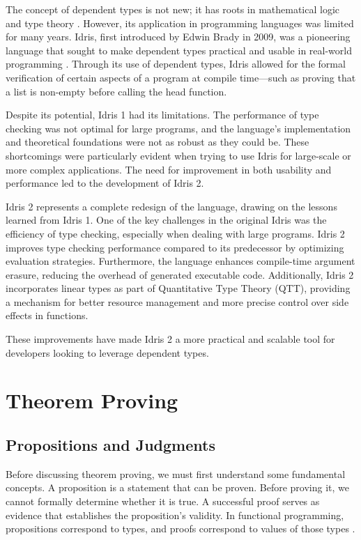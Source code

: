 \documentclass[]{rptuseminar}
\begin{document}
The concept of dependent types is not new; it has roots in mathematical logic and type theory \cite{martin-lof1984}. However, its application in programming languages was limited for many years. Idris, first introduced by Edwin Brady in 2009, was a pioneering language that sought to make dependent types practical and usable in real-world programming \cite{brady2013idris}. Through its use of dependent types, Idris allowed for the formal verification of certain aspects of a program at compile time—such as proving that a list is non-empty before calling the head function.

Despite its potential, Idris 1 had its limitations. The performance of type checking was not optimal for large programs, and the language's implementation and theoretical foundations were not as robust as they could be. These shortcomings were particularly evident when trying to use Idris for large-scale or more complex applications. The need for improvement in both usability and performance led to the development of Idris 2.

Idris 2 represents a complete redesign of the language, drawing on the lessons learned from Idris 1. One of the key challenges in the original Idris was the efficiency of type checking, especially when dealing with large programs. Idris 2 improves type checking performance compared to its predecessor by optimizing evaluation strategies. Furthermore, the language enhances compile-time argument erasure, reducing the overhead of generated executable code. Additionally, Idris 2 incorporates linear types as part of Quantitative Type Theory (QTT), providing a mechanism for better resource management and more precise control over side effects in functions.

These improvements have made Idris 2 a more practical and scalable tool for developers looking to leverage dependent types.
  

\section{Theorem Proving}
\label{sec:Propositions and judgments}

\subsection{Propositions and Judgments}
Before discussing theorem proving, we must first understand some fundamental concepts. A proposition is a statement that can be proven. Before proving it, we cannot formally determine whether it is true. A successful proof serves as evidence that establishes the proposition’s validity. In functional programming, propositions correspond to types, and proofs correspond to values of those types \cite{wadler2015propositions}.
\end{document}
